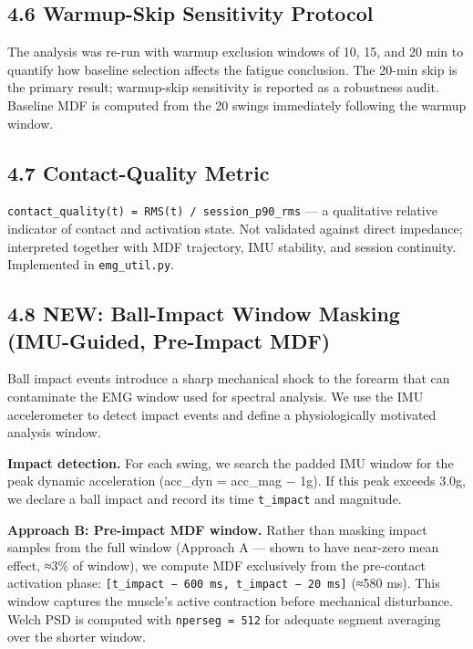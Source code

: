 \documentclass[sensors,article,submit,pdftex,moreauthors]{Definitions/mdpi}
\begin{document}
\subsection{4.6 Warmup-Skip Sensitivity Protocol}\label{warmup-skip-sensitivity-protocol}

The analysis was re-run with warmup exclusion windows of 10, 15, and 20 min to quantify
how baseline selection affects the fatigue conclusion. The 20-min skip is the primary result;
warmup-skip sensitivity is reported as a robustness audit. Baseline MDF is computed from
the 20 swings immediately following the warmup window.

\subsection{4.7 Contact-Quality Metric}\label{contact-quality-metric}

\texttt{contact\_quality(t)\ =\ RMS(t)\ /\ session\_p90\_rms} --- a qualitative relative indicator of
contact and activation state. Not validated against direct impedance; interpreted together
with MDF trajectory, IMU stability, and session continuity. Implemented in \texttt{emg\_util.py}.

\subsection{4.8 NEW: Ball-Impact Window Masking (IMU-Guided, Pre-Impact MDF)}\label{new-ball-impact-window-masking-imu-guided-pre-impact-mdf}

Ball impact events introduce a sharp mechanical shock to the forearm that can contaminate
the EMG window used for spectral analysis. We use the IMU accelerometer to detect impact
events and define a physiologically motivated analysis window.

\textbf{Impact detection.} For each swing, we search the padded IMU window for the peak
dynamic acceleration (acc\_dyn = \textbar acc\_mag − 1g\textbar). If this peak exceeds 3.0g, we declare
a ball impact and record its time \texttt{t\_impact} and magnitude.

\textbf{Approach B: Pre-impact MDF window.} Rather than masking impact samples from the full
window (Approach A --- shown to have near-zero mean effect, ≈3\% of window), we compute
MDF exclusively from the pre-contact activation phase: \texttt{{[}t\_impact\ −\ 600\ ms,\ t\_impact\ −\ 20\ ms{]}}
(≈580 ms). This window captures the muscle's active contraction before mechanical disturbance.
Welch PSD is computed with \texttt{nperseg\ =\ 512} for adequate segment averaging over the shorter window.
\end{document}
